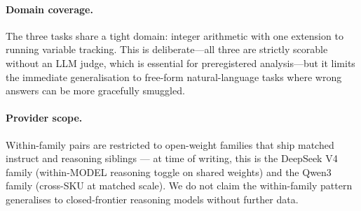 \paragraph{Domain coverage.}
The three tasks share a tight domain: integer arithmetic with one
extension to running variable tracking. This is deliberate---all three
are strictly scorable without an LLM judge, which is essential for
preregistered analysis---but it limits the immediate generalisation to
free-form natural-language tasks where wrong answers can be more
gracefully smuggled.

\paragraph{Provider scope.}
Within-family pairs are restricted to open-weight families that ship
matched instruct and reasoning siblings — at time of writing, this is
the DeepSeek V4 family (within-MODEL reasoning toggle on shared
weights) and the Qwen3 family (cross-SKU at matched scale). We do not
claim the within-family pattern generalises to closed-frontier
reasoning models without further data.
